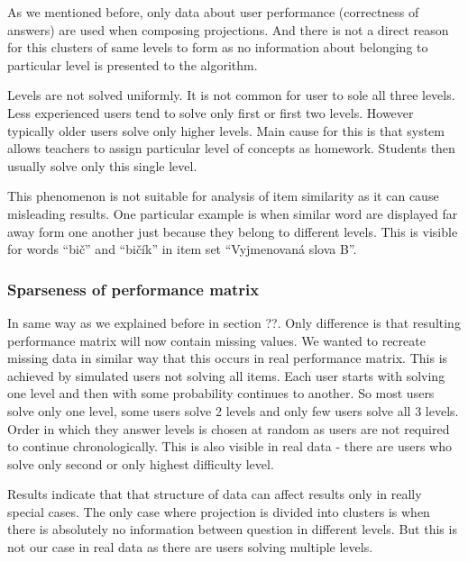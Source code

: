 \documentclass[
  digital, %
  table,   %
  nolof,     %
  nolot,     %
  nocover
]{fithesis3}
\begin{document}
As we mentioned before, only data about user performance (correctness of
answers) are used when composing projections. And there is not a direct
reason for this clusters of same levels to form as no information about
belonging to particular level is presented to the algorithm.


Levels are not solved uniformly. It is not common for user to sole all
three levels. Less experienced users tend to solve only first or first
two levels. However typically older users solve only higher levels. Main
cause for this is that system allows teachers to assign particular level
of concepts as homework. Students then usually solve only this single
level.



This phenomenon is not suitable for analysis of item similarity as it
can cause misleading results. One particular example is when similar
word are displayed far away form one another just because they belong to
different levels. This is visible for words ``bič'' and ``bičík'' in
item set ``Vyjmenovaná slova B''.

\subsubsection{Sparseness of performance
matrix}\label{sparseness-of-performance-matrix}



In same way as we explained before in section ??. Only difference is that resulting performance matrix will now contain missing values. We wanted to recreate missing data in similar way that this occurs in real performance matrix. This is achieved by simulated users not solving all items. Each user starts with solving one level and then with some probability continues to another. So most users solve only one level, some users solve 2 levels and only few users solve all 3 levels. Order in which they answer levels is chosen at random as users are not required to continue chronologically. This is also visible in real data - there are users who solve only second or only highest difficulty level. 

Results indicate that that structure of data can affect results only in really special cases. The only case where projection is divided into clusters is when there is absolutely no information between question in different levels. But this is not our case in real data as there are users solving multiple levels. 
\end{document}
